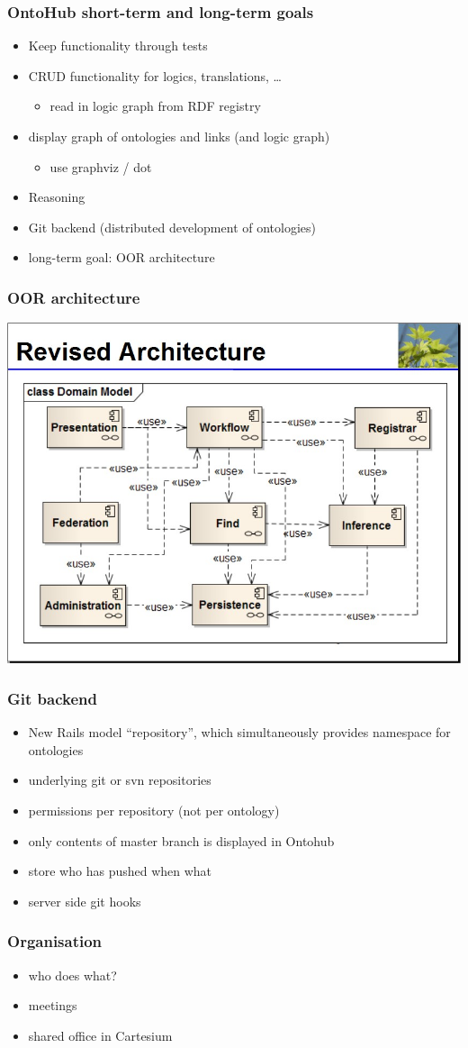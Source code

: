\documentclass[german]{beamer}
\begin{document}
\begin{frame}
\frametitle{OntoHub short-term and long-term goals}
\begin{itemize}
\item Keep functionality through tests
\item CRUD functionality for logics, translations, \ldots
\begin{itemize}
\item read in logic graph from RDF registry
\end{itemize}
\item display graph of ontologies and links (and logic graph)
\begin{itemize}
\item use graphviz / dot
\end{itemize}
\item Reasoning
\item Git backend (distributed development of ontologies)
\item long-term goal: OOR architecture
\end{itemize}
\end{frame}


\begin{frame}
\frametitle{OOR architecture}
\includegraphics[width=\textwidth]{revised-OOR-architecture-proposal--ToddSchneider-KenBaclawski_20101119.jpg}
\end{frame}


\begin{frame}
\frametitle{Git backend}
\begin{itemize}
\item New Rails model ``repository'', which simultaneously provides namespace for ontologies
\item underlying git or svn repositories
\item permissions per repository (not per ontology)
\item only contents of master branch is displayed in Ontohub
\item store who has pushed when what
\item server side git hooks
\end{itemize}
\end{frame}

\begin{frame}
\frametitle{Organisation}
\begin{itemize}
\item who does what?
\item meetings
\item shared office in Cartesium
\end{itemize}
\end{frame}
\end{document}

